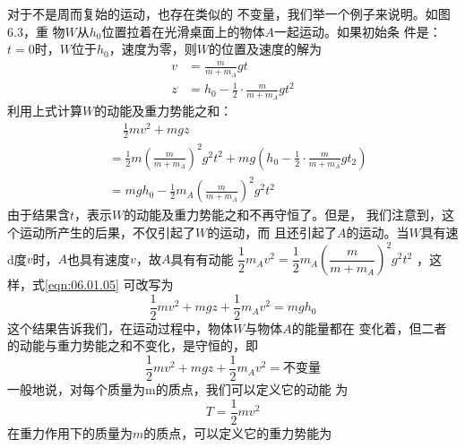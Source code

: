 对于不是周而复始的运动，也存在类似的
不变量，我们举一个例子来说明。如图6.3，重
物$ W $从$ h _ { 0 } $位置拉着在光滑桌面上的物体$ A $一起运动。如果初始条
件是：$ t = 0 $时，$ W $位于$ h _ { 0 } $，速度为零，则$ W $的位置及速度的解为
\begin{equation*}
 \begin{aligned}
 v &= \frac { m } { m + m _ { A } } g t \\
 z &= h _ { 0 } - \frac { 1 } { 2 } \cdot \frac { m } { m + m _ { A } } g t ^ { 2 }
 \end{aligned}
\end{equation*}
利用上式计算$ W $的动能及重力势能之和：
{\setlength{\mathindent}{2em}
\begin{equation}\label{eqn:06.01.05}
 \begin{aligned}
 &\quad \, \frac { 1 } { 2 } m v ^ { 2 } + m g z \\
 &= \frac { 1 } { 2 } m \left( \frac { m } { m + m _ { A } } \right) ^ { 2 } g ^ { 2 } t ^ { 2 } + m g \left( h _ { 0 } - \frac { 1 } { 2 } \cdot \frac { m } { m + m _ { A } } g t _ { 2 } \right) \\
 &= m g h _ { 0 } - \frac { 1 } { 2 } m _ { A } \left( \frac { m } { m + m _ { A } } \right) ^ { 2 } g ^ { 2 } t ^ { 2 }
 \end{aligned}
\end{equation}}
由于结果含$ t $，表示$ W $的动能及重力势能之和不再守恒了。但是，
我们注意到，这个运动所产生的后果，不仅引起了$ W $的运动，而
且还引起了$ A $的运动。当$ W $具有速d度$ v $时，$ A $也具有速度$ v $，故$ A $具有有动能
$ \dfrac { 1 } { 2 } m _ { A } v ^ { 2 } = \dfrac { 1 } { 2 } m _ { A } \left( \dfrac { m } { m + m _ { A } } \right) ^ { 2 } g ^ { 2 } t ^ { 2 } $
，这样，式\eqref{eqn:06.01.05}
可改写为
\begin{equation*}
 \frac { 1 } { 2 } m v ^ { 2 } + m g z + \frac { 1 } { 2 } m _ { A } v ^ { 2 } = m g h _ { 0 }
\end{equation*}
这个结果告诉我们，在运动过程中，物体$ W $与物体$ A $的能量都在
变化着，但二者的动能与重力势能之和不变化，是守恒的，即
\begin{equation}\label{eqn:06.01.06}
 \frac { 1 } { 2 } m v ^ { 2 } + m g z + \frac { 1 } { 2 } m _ { A } v ^ { 2 } = \text{不变量}
\end{equation}
一般地说，对每个质量为m的质点，我们可以定义它的动能
为
\begin{equation*}
 T = \frac { 1 } { 2 } m v ^ { 2 }
\end{equation*}
在重力作用下的质量为$ m $的质点，可以定义它的重力势能为
